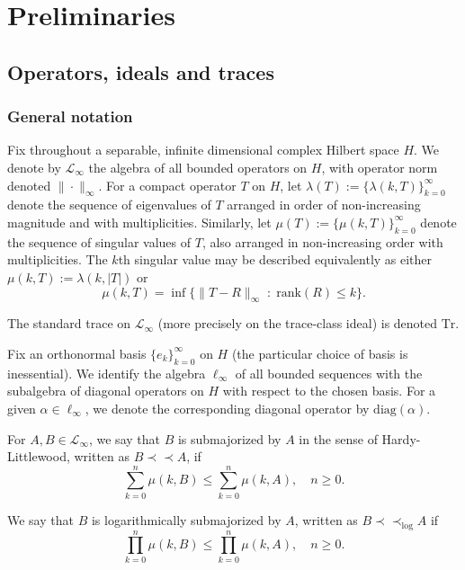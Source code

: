 \chapter{Preliminaries}\label{preliminaries chapter}


\section{Operators, ideals and traces}

\subsection{General notation}\label{general notations subsection}
    Fix throughout a separable, infinite dimensional complex Hilbert space $H$. We denote by $\mathcal{L}_{\infty}$ the algebra of all bounded operators on $H$, with operator norm denoted $\|\cdot\|_\infty.$ For a compact operator $T$ on $H$,
    let $\lambda(T) := \{\lambda(k,T)\}_{k=0}^\infty$ denote the sequence of eigenvalues of $T$ arranged in order of non-increasing magnitude and with multiplicities. Similarly, let $\mu(T) := \{\mu(k,T)\}_{k=0}^\infty$ denote the sequence of singular
    values of $T$, also arranged in non-increasing order with multiplicities. The $k$th singular value may be described equivalently as either $\mu(k,T) := \lambda(k,|T|)$ or 
    \begin{equation*}
        \mu(k,T) = \inf\{\|T-R\|_\infty\;:\;\mathrm{rank}(R)\leq k\}.
    \end{equation*}
    
    The standard trace on $\mathcal{L}_\infty$ (more precisely on the trace-class ideal) is denoted $\mathrm{Tr}$.


    Fix an orthonormal basis $\{e_k\}_{k=0}^\infty$ on $H$ (the particular choice of basis is inessential). We identify the algebra $\ell_\infty$ of all bounded sequences with the subalgebra of diagonal operators on $H$ with respect
    to the chosen basis. For a given $\alpha \in \ell_\infty$, we denote the corresponding diagonal operator by $\mathrm{diag}(\alpha)$.

    For $A,B \in \mathcal{L}_{\infty}$, we say that $B$ is submajorized by $A$ in the sense of Hardy-Littlewood, written as $B \prec\prec A$, if
    \begin{equation*}
        \sum_{k=0}^n \mu(k,B) \leq \sum_{k=0}^n \mu(k,A), \quad n\geq 0.
    \end{equation*}
    
    We say that $B$ is logarithmically submajorized by $A$, written as $B \prec\prec_{\log} A$ if 
    \begin{equation*}
        \prod_{k=0}^n \mu(k,B)\leq \prod_{k=0}^n \mu(k,A),\quad n\geq 0.
    \end{equation*}
    
